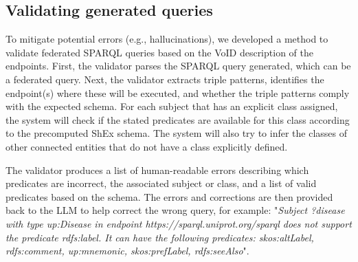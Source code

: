 \documentclass[
]{ceurart}
\begin{document}

\subsection{Validating generated queries}

To mitigate potential errors (e.g., hallucinations), we developed a method to validate federated SPARQL queries based on the VoID description of the endpoints. First, the validator parses the SPARQL query generated, which can be a federated query. Next, the validator extracts triple patterns, identifies the endpoint(s) where these will be executed, and whether the triple patterns comply with the expected schema. For each subject that has an explicit class assigned, the system will check if the stated predicates are available for this class according to the precomputed ShEx schema. The system will also try to infer the classes of other connected entities that do not have a class explicitly defined.




The validator produces a list of human-readable errors describing which predicates are incorrect, the associated subject or class, and a list of valid predicates based on the schema. The errors and  corrections are then provided back to the LLM to help correct the wrong query, for example: "\textit{Subject ?disease with type up:Disease in endpoint https://sparql.uniprot.org/sparql does not support the predicate rdfs:label. It can have the following predicates: skos:altLabel, rdfs:comment, up:mnemonic, skos:prefLabel, rdfs:seeAlso}".
\end{document}
